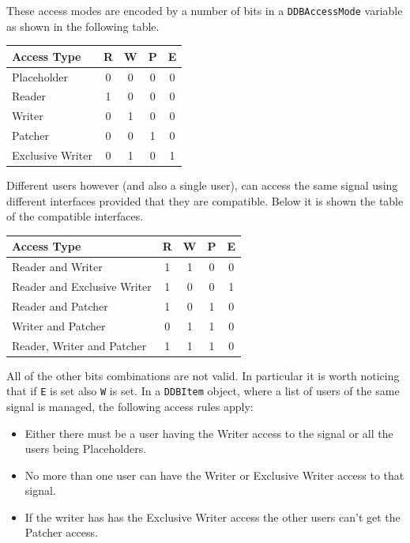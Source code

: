 These access modes are encoded by a number of bits in a \texttt{DDBAccessMode} variable as shown in the following table.

\begin{table}[!h]
 \begin{center}
  \begin{tabular}{|l|c|c|c|c|}
   \hline
\textbf{Access Type} & \textbf{R} & \textbf{W} & \textbf{P} & \textbf{E} \\
   \hline
Placeholder & 0 & 0 & 0 & 0 \\
Reader & 1 & 0 & 0 & 0 \\
Writer & 0 & 1 & 0 & 0 \\
Patcher & 0 & 0 & 1 & 0 \\
Exclusive Writer & 0 & 1 & 0 & 1 \\
   \hline
  \end{tabular}
 \end{center}
\end{table}

Different users however (and also a single user), can access the same signal using different interfaces provided that they are compatible. Below it is shown the table of the compatible interfaces.

\begin{table}[!h]
 \begin{center}
  \begin{tabular}{|l|c|c|c|c|}
   \hline
\textbf{Access Type} & \textbf{R} & \textbf{W} & \textbf{P} & \textbf{E} \\
   \hline
Reader and Writer & 1 & 1 & 0 & 0 \\
Reader and Exclusive Writer & 1 & 0 & 0 & 1 \\
Reader and Patcher & 1 & 0 & 1 & 0 \\
Writer and Patcher & 0 & 1 & 1 & 0 \\
Reader, Writer and Patcher & 1 & 1 & 1 & 0 \\
   \hline
  \end{tabular}
 \end{center}
\end{table}

All of the other bits combinations are not valid. In particular it is worth noticing that if \texttt{E} is set also \texttt{W} is set.
In a \texttt{DDBItem} object, where a list of users of the same signal is managed, the following access rules apply:

\begin{itemize}
 \item Either there must be a user having the Writer access to the signal or all the users being Placeholders.
 \item No more than one user can have the Writer or Exclusive Writer access to that signal.
 \item If the writer has has the Exclusive Writer access the other users can't get the Patcher access.
\end{itemize}

